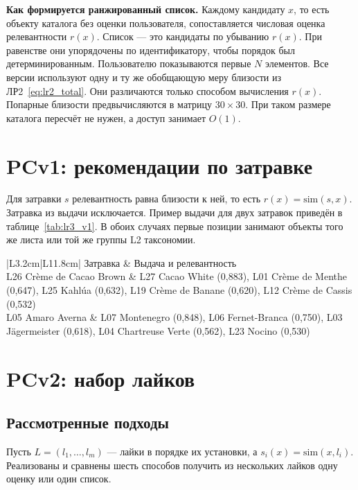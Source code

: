 \textbf{Как формируется ранжированный список.} Каждому кандидату $x$, то есть объекту каталога без оценки пользователя, сопоставляется числовая оценка релевантности $r(x)$. Список --- это кандидаты по убыванию $r(x)$. При равенстве они упорядочены по идентификатору, чтобы порядок был детерминированным. Пользователю показываются первые $N$ элементов. Все версии используют одну и ту же обобщающую меру близости из ЛР2~\eqref{eq:lr2_total}. Они различаются только способом вычисления $r(x)$. Попарные близости предвычисляются в матрицу $30\times30$. При таком размере каталога пересчёт не нужен, а доступ занимает $O(1)$.

\section{PCv1: рекомендации по затравке}

Для затравки $s$ релевантность равна близости к ней, то есть $r(x) = \mathrm{sim}(s, x)$. Затравка из выдачи исключается. Пример выдачи для двух затравок приведён в таблице~\ref{tab:lr3_v1}. В обоих случаях первые позиции занимают объекты того же листа или той же группы L2 таксономии.

\begin{table}[H]
	\centering
	\caption{Выдача PCv1, top-5}
	\label{tab:lr3_v1}
	\footnotesize
	\begin{tabular}{|L{3.2cm}|L{11.8cm}|}
		\hline
		Затравка & Выдача и релевантность \\ \hline
		L26 Cr\`eme de Cacao Brown & L27 Cacao White (0,883), L01 Cr\`eme de Menthe (0,647), L25 Kahl\'ua (0,632), L19 Cr\`eme de Banane (0,620), L12 Cr\`eme de Cassis (0,532) \\ \hline
		L05 Amaro Averna & L07 Montenegro (0,848), L06 Fernet-Branca (0,750), L03 J\"agermeister (0,618), L04 Chartreuse Verte (0,562), L23 Nocino (0,530) \\ \hline
	\end{tabular}
\end{table}

\section{PCv2: набор лайков}
\label{sec:lr3_v2}

\subsection{Рассмотренные подходы}

Пусть $L = (l_1,\ldots,l_m)$ --- лайки в порядке их установки, а $s_i(x) = \mathrm{sim}(x, l_i)$. Реализованы и сравнены шесть способов получить из нескольких лайков одну оценку или один список.

